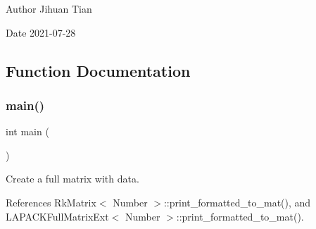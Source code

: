 \begin{DoxyAuthor}{Author}
Jihuan Tian 
\end{DoxyAuthor}
\begin{DoxyDate}{Date}
2021-\/07-\/28 
\end{DoxyDate}


\subsection{Function Documentation}
\mbox{\label{lapack-matrix-global-to-rkmatrix_8cc_ae66f6b31b5ad750f1fe042a706a4e3d4}} 
\subsubsection{\texorpdfstring{main()}{main()}}
{\footnotesize\ttfamily int main (\begin{DoxyParamCaption}{ }\end{DoxyParamCaption})}

Create a full matrix with data.

References Rk\+Matrix$<$ Number $>$\+::print\+\_\+formatted\+\_\+to\+\_\+mat(), and L\+A\+P\+A\+C\+K\+Full\+Matrix\+Ext$<$ Number $>$\+::print\+\_\+formatted\+\_\+to\+\_\+mat().

